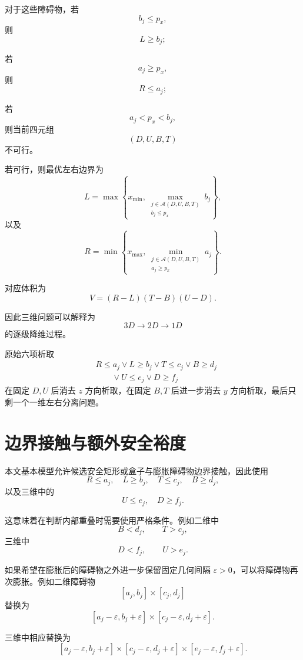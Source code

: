 \documentclass[UTF8,12pt,a4paper]{ctexart}
\begin{document}
对于这些障碍物，若
\[
b_j\le p_x,
\]
则
\[
L\ge b_j;
\]

若
\[
a_j\ge p_x,
\]
则
\[
R\le a_j;
\]

若
\[
a_j<p_x<b_j,
\]
则当前四元组
\[
(D,U,B,T)
\]
不可行。

若可行，则最优左右边界为
\begin{equation}
\boxed{
L
=
\max
\left\{
x_{\min},
\max_{\substack{
j\in\mathcal A(D,U,B,T)\\
b_j\le p_x}}
b_j
\right\},
}
\end{equation}
以及
\begin{equation}
\boxed{
R
=
\min
\left\{
x_{\max},
\min_{\substack{
j\in\mathcal A(D,U,B,T)\\
a_j\ge p_x}}
a_j
\right\}.
}
\end{equation}

对应体积为
\begin{equation}
\boxed{
V
=
(R-L)(T-B)(U-D).
}
\end{equation}

因此三维问题可以解释为
\[
3D
\longrightarrow
2D
\longrightarrow
1D
\]
的逐级降维过程。

原始六项析取
\[
\begin{aligned}
&R\le a_j
\lor
L\ge b_j
\lor
T\le c_j
\lor
B\ge d_j\\
&\qquad\lor
U\le e_j
\lor
D\ge f_j
\end{aligned}
\]
在固定 $D,U$ 后消去 $z$ 方向析取，在固定 $B,T$ 后进一步消去 $y$ 方向析取，最后只剩一个一维左右分离问题。

\section{边界接触与额外安全裕度}

本文基本模型允许候选安全矩形或盒子与膨胀障碍物边界接触，因此使用
\[
R\le a_j,
\quad
L\ge b_j,
\quad
T\le c_j,
\quad
B\ge d_j,
\]
以及三维中的
\[
U\le e_j,
\quad
D\ge f_j.
\]

这意味着在判断内部重叠时需要使用严格条件。例如二维中
\[
B<d_j,
\qquad
T>c_j,
\]
三维中
\[
D<f_j,
\qquad
U>e_j.
\]

如果希望在膨胀后的障碍物之外进一步保留固定几何间隔 $\varepsilon>0$，可以将障碍物再次膨胀。例如二维障碍物
\[
[a_j,b_j]\times[c_j,d_j]
\]
替换为
\[
[a_j-\varepsilon,b_j+\varepsilon]
\times
[c_j-\varepsilon,d_j+\varepsilon].
\]

三维中相应替换为
\[
[a_j-\varepsilon,b_j+\varepsilon]
\times
[c_j-\varepsilon,d_j+\varepsilon]
\times
[e_j-\varepsilon,f_j+\varepsilon].
\]
\end{document}
